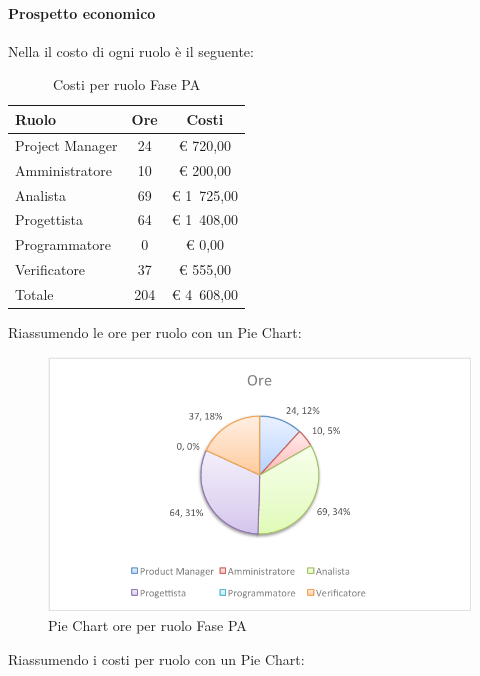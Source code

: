 			\paragraph{Prospetto economico}
				Nella  il costo di ogni ruolo è il seguente:
				\begin{table}[H]
					\begin{center}
						\begin{tabular}{| l | c | c |}
							\hline
							Ruolo 			& Ore 	& Costi  \\ \hline
							
							Project Manager	& 24 		& \euro{} 720,00 	\\
							Amministratore 		& 10 		& \euro{} 200,00 	\\
							Analista	 		& 69 		& \euro{} 1~725,00 	\\
							Progettista 		& 64 		& \euro{} 1~408,00  	\\
							Programmatore		& 0		& \euro{} 0,00	\\
							Verificatore		& 37 		& \euro{} 555,00 	\\ \hline \hline
							
							Totale	 		& 204 	& \euro{} 4~608,00 	\\ \hline
						\end{tabular}
					\end{center}
					\caption{Costi per ruolo Fase PA}
				\end{table}
				Riassumendo le ore per ruolo con un Pie Chart:
				\begin{figure}[H]\centering
					\includegraphics[width=\textwidth]{PianoDiProgetto/Pics/ChartTotOreFasePA.pdf}
					\caption{Pie Chart ore per ruolo Fase PA}
				\end{figure}
				Riassumendo i costi per ruolo con un Pie Chart:
